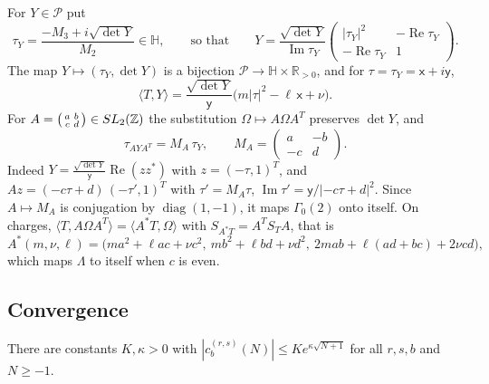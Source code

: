 For $Y\in\mathcal P$ put
\[
\tau_Y=\frac{-M_3+i\sqrt{\det Y}}{M_2}\in\mathbb H,\qquad\text{so that}\qquad Y=\frac{\sqrt{\det Y}}{\operatorname{Im}\tau_Y}\begin{pmatrix}|\tau_Y|^2&-\operatorname{Re}\tau_Y\\-\operatorname{Re}\tau_Y&1\end{pmatrix}.
\]
The map $Y\mapsto(\tau_Y,\det Y)$ is a bijection $\mathcal P\to\mathbb H\times\mathbb R_{>0}$, and for $\tau=\tau_Y=\mathsf x+i\mathsf y$,
\begin{equation}\label{eq:pairing}
\langle T,Y\rangle=\frac{\sqrt{\det Y}}{\mathsf y}\big(m|\tau|^2-\ell\,\mathsf x+\nu\big).
\end{equation}
For $A=\begin{psmallmatrix}a&b\\c&d\end{psmallmatrix}\in SL_2(\mathbb{Z})$ the substitution $\Omega\mapsto A\Omega A^T$ preserves $\det Y$, and
\begin{equation}\label{eq:tauaction}
\tau_{AYA^T}=M_A\,\tau_Y,\qquad M_A=\begin{pmatrix}a&-b\\-c&d\end{pmatrix}.
\end{equation}
Indeed $Y=\frac{\sqrt{\det Y}}{\mathsf y}\operatorname{Re}(zz^*)$ with $z=(-\tau,1)^T$, and $Az=(-c\tau+d)\,(-\tau',1)^T$ with $\tau'=M_A\tau$, $\operatorname{Im}\tau'=\mathsf y/|{-c\tau+d}|^2$. Since $A\mapsto M_A$ is conjugation by $\operatorname{diag}(1,-1)$, it maps $\Gamma_0(2)$ onto itself. On charges, $\langle T,A\Omega A^T\rangle=\langle A^{\ast}T,\Omega\rangle$ with $S_{A^\ast T}=A^TS_TA$, that is
\begin{equation}\label{eq:chargeaction}
A^\ast(m,\nu,\ell)=\big(ma^2+\ell ac+\nu c^2,\ mb^2+\ell bd+\nu d^2,\ 2mab+\ell(ad+bc)+2\nu cd\big),
\end{equation}
which maps $\Lambda$ to itself when $c$ is even.

\subsection{Convergence}

\begin{lemma}\label{lem:growth}
There are constants $K,\kappa>0$ with $|c^{(r,s)}_b(N)|\le Ke^{\kappa\sqrt{N+1}}$ for all $r,s,b$ and $N\ge-1$.
\end{lemma}

